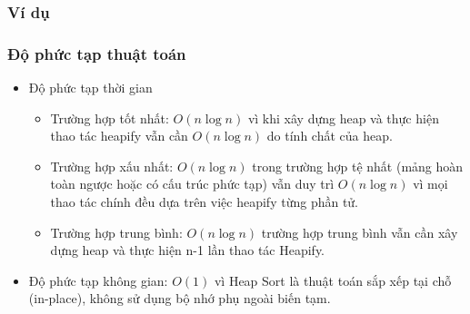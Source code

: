 \subsubsection{Ví dụ}

\subsubsection{Độ phức tạp thuật toán}

\begin{itemize}
    \item Độ phức tạp thời gian
    \begin{itemize}[label=$\circ$]
        \item Trường hợp tốt nhất: $O(n\log{n})$ vì khi xây dựng heap 
        và thực hiện thao tác heapify vẫn cần $O(n \log n)$ do tính 
        chất của heap.
        \item Trường hợp xấu nhất: $O(n\log{n})$ trong trường hợp tệ 
        nhất (mảng hoàn toàn ngược hoặc có cấu trúc phức tạp) vẫn duy 
        trì $O(n \log n)$ vì mọi thao tác chính đều dựa trên việc 
        heapify từng phần tử.
        \item Trường hợp trung bình: $O(n\log{n})$ trường hợp trung bình 
        vẫn cần xây dựng heap và thực hiện n-1 lần thao tác Heapify.
    \end{itemize}
    \item Độ phức tạp không gian: $O(1)$ vì Heap Sort là thuật toán 
    sắp xếp tại chỗ (in-place), không sử dụng bộ nhớ phụ ngoài biến tạm.
\end{itemize}